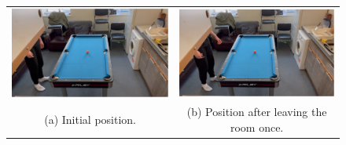 \documentclass[ %
                author={Finn Alexander Wilkinson},
                supervisor={Dr. Andrew Calway},
                degree={MEng},
                title={\centering A Mixed Reality Aim Assistant for Pool and Snooker},
                subtitle={},
                type={Enterprise},
                year={2021} ]{dissertation}
\begin{document}
\begin{figure}[h!]
    \centering
    \begin{tabular}{cc}
         \includegraphics[scale = 0.15]{Images/Eval/Leave Room/Frame 1 - 0 leaves.PNG} & \includegraphics[scale = 0.15]{Images/Eval/Leave Room/Frame 2 - 1 leaves.PNG} \\
         (a) Initial position. & (b) Position after leaving the room once. \\[6pt]

\end{tabular}
\end{figure}
\end{document}
